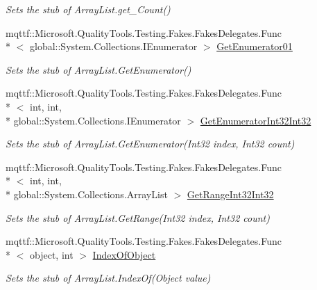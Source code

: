 \begin{DoxyCompactItemize}
\begin{DoxyCompactList}\small\item\em Sets the stub of Array\-List.\-get\-\_\-\-Count()\end{DoxyCompactList}\item 
mqttf\-::\-Microsoft.\-Quality\-Tools.\-Testing.\-Fakes.\-Fakes\-Delegates.\-Func\\*
$<$ global\-::\-System.\-Collections.\-I\-Enumerator $>$ \hyperlink{class_system_1_1_collections_1_1_fakes_1_1_stub_array_list_ad59c2061a3fc03484408b6dda5eafa56}{Get\-Enumerator01}
\begin{DoxyCompactList}\small\item\em Sets the stub of Array\-List.\-Get\-Enumerator()\end{DoxyCompactList}\item 
mqttf\-::\-Microsoft.\-Quality\-Tools.\-Testing.\-Fakes.\-Fakes\-Delegates.\-Func\\*
$<$ int, int, \\*
global\-::\-System.\-Collections.\-I\-Enumerator $>$ \hyperlink{class_system_1_1_collections_1_1_fakes_1_1_stub_array_list_a5fe28c5381dbe00f541af8334a2ca357}{Get\-Enumerator\-Int32\-Int32}
\begin{DoxyCompactList}\small\item\em Sets the stub of Array\-List.\-Get\-Enumerator(\-Int32 index, Int32 count)\end{DoxyCompactList}\item 
mqttf\-::\-Microsoft.\-Quality\-Tools.\-Testing.\-Fakes.\-Fakes\-Delegates.\-Func\\*
$<$ int, int, \\*
global\-::\-System.\-Collections.\-Array\-List $>$ \hyperlink{class_system_1_1_collections_1_1_fakes_1_1_stub_array_list_ac4ced8b31a1aa51750cb83e154f4c251}{Get\-Range\-Int32\-Int32}
\begin{DoxyCompactList}\small\item\em Sets the stub of Array\-List.\-Get\-Range(\-Int32 index, Int32 count)\end{DoxyCompactList}\item 
mqttf\-::\-Microsoft.\-Quality\-Tools.\-Testing.\-Fakes.\-Fakes\-Delegates.\-Func\\*
$<$ object, int $>$ \hyperlink{class_system_1_1_collections_1_1_fakes_1_1_stub_array_list_a5ef9b0801f77e0e0ba7886a66dfc3974}{Index\-Of\-Object}
\begin{DoxyCompactList}\small\item\em Sets the stub of Array\-List.\-Index\-Of(\-Object value)\end{DoxyCompactList}\item 

\end{DoxyCompactItemize}
